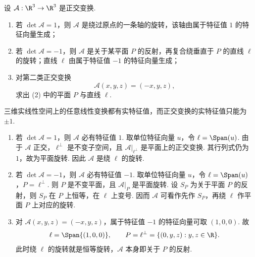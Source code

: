 \begin{problem}

	设 $\mathcal A:\R^3\to\R^3$ 是正交变换.
	\begin{enumerate}
		\item 若 $\det\mathcal A=1$，则 $\mathcal A$ 是绕过原点的一条轴的旋转，该轴由属于特征值 $1$ 的特征向量生成；
		\item 若 $\det\mathcal A=-1$，则 $\mathcal A$ 是关于某平面 $P$ 的反射，再复合绕垂直于 $P$ 的直线 $\ell$ 的旋转；直线 $\ell$ 由属于特征值 $-1$ 的特征向量生成；
		\item 对第二类正交变换
		\[
		\mathcal A(x,y,z)=(-x,y,z),
		\]
		求出 (2) 中的平面 $P$ 与直线 $\ell$.
	\end{enumerate}
\end{problem}
\begin{solution}
	三维实线性空间上的任意线性变换都有实特征值，而正交变换的实特征值只能为 $\pm1$.
	\begin{enumerate}
		\item 若 $\det\mathcal A=1$，则 $\mathcal A$ 必有特征值 $1$. 取单位特征向量 $u$，令 $\ell=\Span(u)$. 由于 $\mathcal A$ 正交，$\ell^\perp$ 是不变子空间，且 $\mathcal A|_{\ell^\perp}$ 是平面上的正交变换. 其行列式仍为 $1$，故为平面旋转. 因此 $\mathcal A$ 是绕 $\ell$ 的旋转.
		\item 若 $\det\mathcal A=-1$，则 $\mathcal A$ 必有特征值 $-1$. 取单位特征向量 $u$，令 $\ell=\Span(u)$，$P=\ell^\perp$. 则 $P$ 是不变平面，且 $\mathcal A|_P$ 是平面旋转. 设 $S_P$ 为关于平面 $P$ 的反射，则 $S_P$ 在 $P$ 上恒等，在 $\ell$ 上变号. 因而 $\mathcal A$ 可看作先作 $S_P$，再绕 $\ell$ 作平面 $P$ 上对应的旋转.
		\item 对 $\mathcal A(x,y,z)=(-x,y,z)$，属于特征值 $-1$ 的特征向量可取 $(1,0,0)$. 故
		\[
		\ell=\Span\{(1,0,0)\},
		\qquad
		P=\ell^\perp=\{(0,y,z):y,z\in\R\}.
		\]
		此时绕 $\ell$ 的旋转就是恒等旋转，$\mathcal A$ 本身即关于 $P$ 的反射.
	\end{enumerate}
\end{solution}


